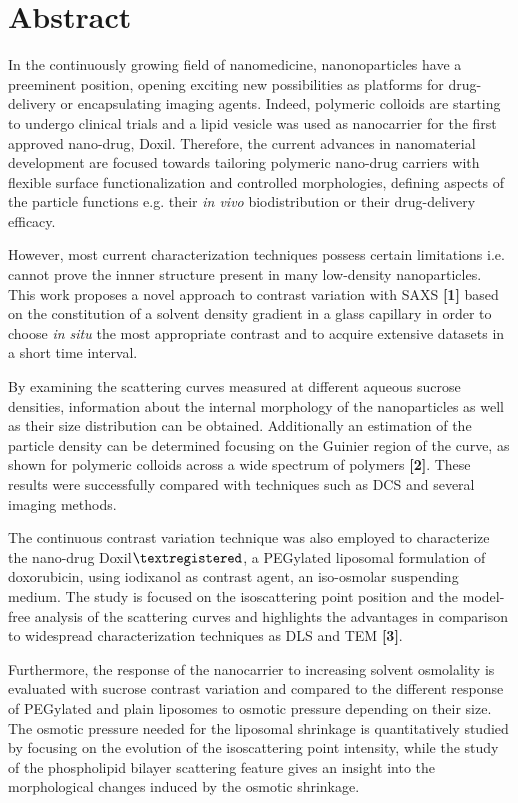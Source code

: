 \chapter*{Abstract}
\thispagestyle{empty}


In the continuously growing field of nanomedicine, nanonoparticles have a preeminent position, opening exciting new possibilities as platforms for drug-delivery or encapsulating imaging agents. Indeed, polymeric colloids are starting to undergo clinical trials and a lipid vesicle was used as nanocarrier for the first approved nano-drug, Doxil. Therefore, the current advances in nanomaterial development are focused towards tailoring polymeric nano-drug carriers with flexible surface functionalization and controlled morphologies, defining aspects of the particle functions e.g. their \emph{in vivo} biodistribution or their drug-delivery efficacy. 

However, most current characterization techniques possess certain limitations i.e. cannot prove the innner structure present in many low-density nanoparticles. This work proposes a novel approach to contrast variation with SAXS \textbf{[1]} based on the constitution of a solvent density gradient in a glass capillary in order to choose \emph{in situ} the most appropriate contrast and to acquire extensive datasets in a short time interval.

By examining the scattering curves measured at different aqueous sucrose densities, information about the internal morphology of the nanoparticles as well as their size distribution can be obtained. Additionally an estimation of the particle density can be determined focusing on the Guinier region of the curve, as shown for polymeric colloids across a wide spectrum of polymers \textbf{[2]}. These results were successfully compared with techniques such as DCS and several imaging methods.

The continuous contrast variation technique was also employed to characterize the nano-drug Doxil$\textregistered$, a PEGylated liposomal formulation of doxorubicin, using iodixanol as contrast agent, an iso-osmolar suspending medium. The study is focused on the isoscattering point position and the model-free analysis of the scattering curves and highlights the advantages in comparison to widespread characterization techniques as DLS and TEM \textbf{[3]}.

Furthermore, the response of the nanocarrier to increasing solvent osmolality is evaluated with sucrose contrast variation and compared to the different response of PEGylated and plain liposomes to osmotic pressure depending on their size. The osmotic pressure needed for the liposomal shrinkage is quantitatively studied by focusing on the evolution of the isoscattering point intensity, while the study of the phospholipid bilayer scattering feature gives an insight into the morphological changes induced by the osmotic shrinkage.

